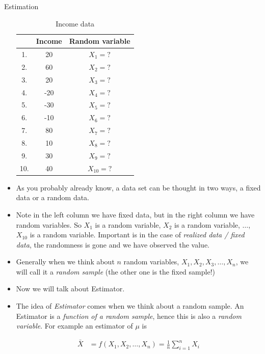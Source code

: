 \documentclass[8pt, usepdftitle=false]{beamer}
\begin{document}
\begin{frame}[allowframebreaks]{Estimation}
\begin{itemize}
    \small{
      \begin{table}[H]
      \begin{tabular}{|c|c|c|}
      \hline & Income & Random variable \\
      \hline 1. & 20 & $X_1=?$ \\
      \hline 2. & 60 & $X_2=?$ \\
      \hline 3. & 20 & $X_3=?$ \\
      \hline 4. & -20 & $X_4=?$ \\
      \hline 5. & -30 & $X_5=?$ \\
      \hline 6. & -10 & $X_6=?$ \\
      \hline 7. & 80 & $X_7=?$ \\
      \hline 8. & 10 & $X_8=?$ \\
      \hline 9. & 30 & $X_9=?$ \\
      \hline 10. & 40 & $X_{10}=?$ \\
      \hline
      \end{tabular}
      \caption{Income data}
      \end{table}
    }


\item As you probably already know, a data set can be thought in two ways, a fixed data or a random data. 

\item Note in the left column we have fixed data, but in the right column we have random variables. So  $X_1$ is a random variable, $X_2$ is a random variable, $\ldots$, $X_{10}$ is a random variable. Important is in the case of  \emph{realized data / fixed data},  the randomness is gone and we have observed the value.





 \item Generally  when we think about $n$ random variables,  $X_1, X_2, X_3, \ldots, X_{n}$, we will call it a \emph{random sample} (the other one is the fixed sample!)

 \item Now we will talk about Estimator. 

 \item The idea of \emph{Estimator} comes when we think about a random sample. An Estimator is a \emph{function of a random sample}, hence this is also a \emph{random variable}. For example an estimator of $\mu$ is 

  \begin{align*}
    \bar{X} &= f(X_1, X_2, \ldots, X_n) = \frac{1}{n}\sum_{i = 1}^{n} X_i
  \end{align*}


\end{itemize}
\end{frame}
\end{document}
